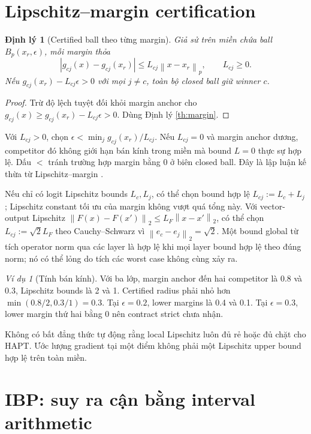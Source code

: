 \documentclass[11pt,a4paper]{article}
\newcommand{\norm}[1]{\left\lVert #1\right\rVert}
\newtheorem{theorem}[definition]{Định lý}
\theoremstyle{remark}
\newtheorem{example}[definition]{Ví dụ}
\begin{document}
\section{Lipschitz--margin certification}
\begin{theorem}[Certified ball theo từng margin]\label{th:lip}
Giả sử trên miền chứa ball $B_p(x_r,\epsilon)$, mỗi margin thỏa
\begin{equation}
 |g_{cj}(x)-g_{cj}(x_r)|\le L_{cj}\norm{x-x_r}_p,
 \qquad L_{cj}\ge0.
\end{equation}
Nếu $g_{cj}(x_r)-L_{cj}\epsilon>0$ với mọi $j\ne c$, toàn bộ closed ball
giữ winner $c$.
\end{theorem}
\begin{proof}
Trừ độ lệch tuyệt đối khỏi margin anchor cho
$g_{cj}(x)\ge g_{cj}(x_r)-L_{cj}\epsilon>0$. Dùng Định lý
\ref{th:margin}.
\end{proof}
Với $L_{cj}>0$, chọn $\epsilon<\min_j g_{cj}(x_r)/L_{cj}$. Nếu $L_{cj}=0$
và margin anchor dương, competitor đó không giới hạn bán kính trong miền
mà bound $L=0$ thực sự hợp lệ. Dấu $<$ tránh trường hợp margin bằng 0 ở
biên closed ball. Đây là lập luận kế thừa từ Lipschitz--margin \cite{lmt}.

Nếu chỉ có logit Lipschitz bounds $L_c,L_j$, có thể chọn bound hợp lệ
$L_{cj}:=L_c+L_j$; Lipschitz constant tối ưu của margin không vượt quá tổng
này. Với vector-output Lipschitz $\norm{F(x)-F(x')}_2
\le L_F\norm{x-x'}_2$, có thể chọn $L_{cj}:=\sqrt2 L_F$ theo
Cauchy--Schwarz vì $\norm{e_c-e_j}_2=\sqrt2$.
Một bound global từ tích operator norm qua các layer là hợp lệ khi mọi
layer bound hợp lệ theo đúng norm; nó có thể lỏng do tích các worst case
không cùng xảy ra.

\begin{example}[Tính bán kính]
Với ba lớp, margin anchor đến hai competitor là 0.8 và 0.3, Lipschitz bounds
là 2 và 1. Certified radius phải nhỏ hơn
$\min(0.8/2,0.3/1)=0.3$. Tại $\epsilon=0.2$, lower margins là 0.4 và 0.1.
Tại $\epsilon=0.3$, lower margin thứ hai bằng 0 nên contract strict chưa nhận.
\end{example}
Không có bất đẳng thức tự động rằng local Lipschitz luôn đủ rẻ hoặc đủ
chặt cho HAPT. Ước lượng gradient tại một điểm không phải một Lipschitz
upper bound hợp lệ trên toàn miền.

\section{IBP: suy ra cận bằng interval arithmetic}
\end{document}
